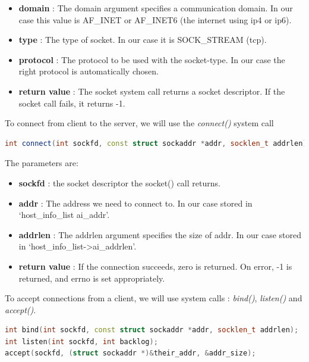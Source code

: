 \documentclass{article}
\begin{document}
				\begin{itemize}
				\item \textbf{domain} : The domain argument specifies a communication domain. In our case this value is AF\_INET or AF\_INET6 (the internet using ip4 or ip6). 
				\item \textbf{type} : The type of socket. In our case it is SOCK\_STREAM (tcp). 
				\item \textbf{protocol} : The protocol to be used with the socket-type. In our case the right protocol is automatically chosen. 
				\item \textbf{return value} : The socket system call returns a socket descriptor. If the socket call fails, it returns -1. 
				\end{itemize}

				To connect from client to the server, we will use the \textit{connect()} system call

				\begin{lstlisting}[language=C++, caption ={connect() function}]
int connect(int sockfd, const struct sockaddr *addr, socklen_t addrlen); 
				\end{lstlisting} 	

				The parameters are:

				\begin{itemize}
				\item \textbf{sockfd} : the socket descriptor the socket() call returns. 
				\item \textbf{addr} : The address we need to connect to. In our case stored in `host\_info\_list ai\_addr'. 
				\item \textbf{addrlen} : The addrlen argument specifies the size of addr. In our case stored in `host\_info\_list->ai\_addrlen'. 
				\item \textbf{return value} : If the connection succeeds, zero is returned. On error, -1 is returned, and errno is set appropriately.
				\end{itemize}

				To accept connections from a client, we will use system calls : \textit{bind()}, \textit{listen()} and \textit{accept()}.

				\begin{lstlisting}[language=C++, caption ={bind(), listen() and accept() function}]
int bind(int sockfd, const struct sockaddr *addr, socklen_t addrlen); 
int listen(int sockfd, int backlog);
accept(sockfd, (struct sockaddr *)&their_addr, &addr_size); 
				\end{lstlisting}				 
\end{document}
